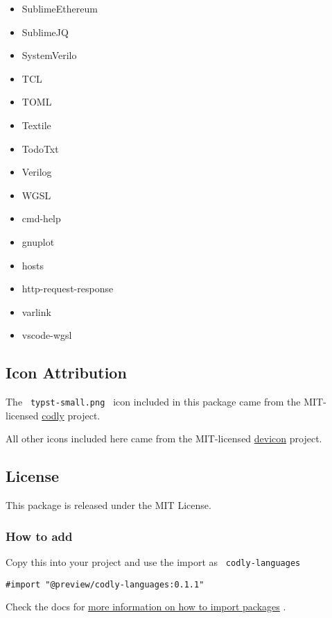 \begin{itemize}
\item
  SublimeEthereum
\item
  SublimeJQ
\item
  SystemVerilo
\item
  TCL
\item
  TOML
\item
  Textile
\item
  TodoTxt
\item
  Verilog
\item
  WGSL
\item
  cmd-help
\item
  gnuplot
\item
  hosts
\item
  http-request-response
\item
  varlink
\item
  vscode-wgsl
\end{itemize}

\subsection{Icon Attribution}\label{icon-attribution}

The \texttt{\ typst-small.png\ } icon included in this package came from
the MIT-licensed \href{https://github.com/Dherse/codly}{codly} project.

All other icons included here came from the MIT-licensed
\href{https://github.com/devicons/devicon/}{devicon} project.

\subsection{License}\label{license}

This package is released under the MIT License.

\subsubsection{How to add}\label{how-to-add}

Copy this into your project and use the import as
\texttt{\ codly-languages\ }

\begin{verbatim}
#import "@preview/codly-languages:0.1.1"
\end{verbatim}



Check the docs for
\href{https://typst.app/docs/reference/scripting/\#packages}{more
information on how to import packages} .

